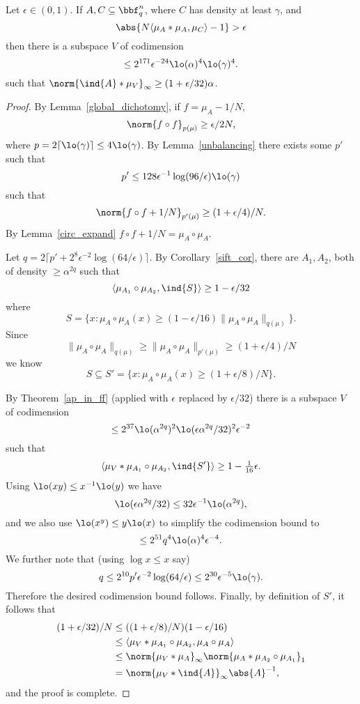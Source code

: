 \begin{proposition}
\label{di_in_ff}
\leanok
Let $\epsilon \in (0,1)$. If $A,C\subseteq \bbf_q^n$, where $C$ has density at least $\gamma$, and
\[\abs{N\langle \mu_A\ast \mu_A,\mu_C\rangle -1}> \epsilon\]
then there is a subspace $V$ of codimension
\[\leq 2^{171}\epsilon^{-24}\lo(\alpha)^4\lo(\gamma)^4.\]
such that $\norm{\ind{A}\ast \mu_V}_\infty \geq (1+\epsilon/32)\alpha$.
\end{proposition}

\begin{proof}
\leanok

By Lemma~\ref{global_dichotomy}, if $f=\mu_A-1/N$,
\[\norm{f\circ f}_{p(\mu)}\geq \epsilon /2N,\]
where $p=2\lceil \lo(\gamma)\rceil\leq 4\lo(\gamma)$. By Lemma~\ref{unbalancing} there exists some $p'$ such that
\[p'\leq 128\epsilon^{-1}\log(96/\epsilon)\lo(\gamma)\]
such that
\[\norm{f\circ f+1/N}_{p'(\mu)}\geq (1+\epsilon/4)/N.\]
By Lemma~\ref{circ_expand} $f\circ f+1/N=\mu_A\circ \mu_A$.

Let $q=2\lceil p'+2^8\epsilon^{-2}\log(64/\epsilon)\rceil$. By Corollary~\ref{sift_cor}, there are $A_1,A_2$, both of density $\geq \alpha^{2q}$ such that
\[\langle \mu_{A_1}\circ \mu_{A_2},\ind{S}\rangle \geq 1-\epsilon/32\]
where
\[S=\{x : \mu_A\circ \mu_A(x)\geq (1-\epsilon/16)\| \mu_A\circ \mu_A\|_{q(\mu)}\}.\]
Since
\[\| \mu_A\circ \mu_A\|_{q(\mu)}\geq \| \mu_A\circ \mu_A\|_{p'(\mu)}\geq (1+\epsilon/4)/N\]
we know
\[S\subseteq S'=\{x : \mu_A\circ \mu_A(x)\geq (1+\epsilon/8)/N\}.\]

By Theorem~\ref{ap_in_ff} (applied with $\epsilon$ replaced by $\epsilon/32$) there is a subspace $V$ of codimension
\[\leq 2^{37}\lo(\alpha^{2q})^2\lo(\epsilon\alpha^{2q}/32)^2\epsilon^{-2}\] such that
\[\langle \mu_V\ast \mu_{A_1}\circ \mu_{A_2},\ind{S'}\rangle \geq 1-\tfrac{1}{16}\epsilon.\]
Using $\lo(xy)\leq x^{-1}\lo(y)$ we have
\[\lo(\epsilon \alpha^{2q}/32)\leq 32\epsilon^{-1}\lo(\alpha^{2q}),\]
and we also use $\lo(x^y)\leq y\lo(x)$ to simplify the codimension bound to
\[\leq 2^{51}q^4\lo(\alpha)^4\epsilon^{-4}.\]
We further note that (using $\log x\leq x$ say)
\[q\leq 2^{10}p'\epsilon^{-2}\log(64/\epsilon)\leq 2^{30}\epsilon^{-5}\lo(\gamma).\]
Therefore the desired codimension bound follows. Finally, by definition of $S'$, it follows that
\begin{align*}
(1+\epsilon/32)/N
&\leq ((1+\epsilon/8)/N)(1-\epsilon/16)\\
&\leq \langle \mu_V\ast \mu_{A_1}\circ \mu_{A_2},\mu_A\circ \mu_A\rangle\\
&\leq \norm{\mu_V\ast \mu_A}_\infty \norm{\mu_{A}\ast \mu_{A_2}\circ \mu_{A_1}}_1\\
&= \norm{\mu_V\ast \ind{A}}_\infty\abs{A}^{-1},
\end{align*}
and the proof is complete.
\end{proof}


